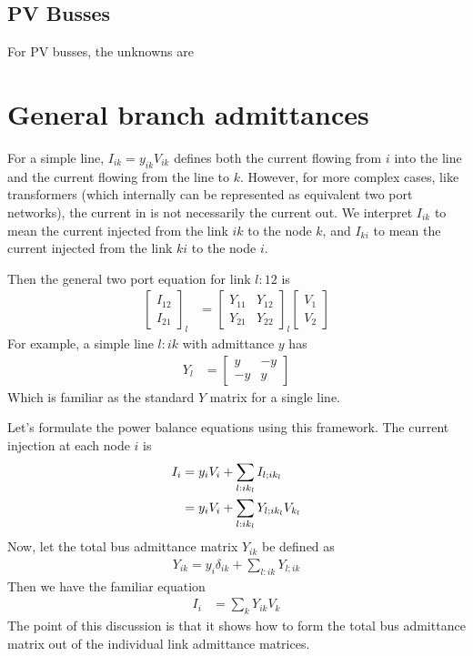 \documentclass[11pt]{article}
\begin{document}
\subsection{PV Busses}
For PV busses, the unknowns are 

\section{General branch admittances}
For a simple line, $I_{ik} = y_{ik}V_{ik}$ defines both the current flowing from $i$ into the line and the current flowing from the line to $k$. However, for more complex cases, like transformers (which internally can be represented as equivalent two port networks), the current in is not necessarily the current out. We interpret $I_{ik}$ to mean the current injected from the link $ik$ to the node $k$, and $I_{ki}$ to mean the current injected from the link $ki$ to the node $i$.

Then the general two port equation for link $l:12$ is
\begin{align}
	\begin{bmatrix}
		I_{12} \\
		I_{21}
	\end{bmatrix}_l
	&=
	\begin{bmatrix}
		Y_{11} & Y_{12} \\
		Y_{21} & Y_{22}
	\end{bmatrix}_l
		\begin{bmatrix}
		V_1 \\
		V_2
	\end{bmatrix}
\end{align}
For example, a simple line $l:ik$ with admittance $y$ has
\begin{align}
	Y_l &=
	\begin{bmatrix}
		y & -y \\ -y & y
	\end{bmatrix}
\end{align}
Which is familiar as the standard $Y$ matrix for a single line.

Let's formulate the power balance equations using this framework. The current injection at each node $i$ is
\begin{align}
I_i &= y_iV_i + \sum_{l:ik_l} I_{l;ik_l} \notag \\
&=  y_iV_i + \sum_{l:ik_l} Y_{l;ik_l}V_{k_l}
\end{align}
Now, let the total bus admittance matrix $Y_{ik}$ be defined as
\begin{align}
	Y_{ik} = y_i\delta_{ik} + \sum_{l:ik}Y_{l;ik}
\end{align}
Then we have the familiar equation
\begin{align}
	I_i &= \sum_k Y_{ik}V_k
\end{align}
 The point of this discussion is that it shows how to form the total bus admittance matrix out of the individual link admittance matrices.
\end{document}

